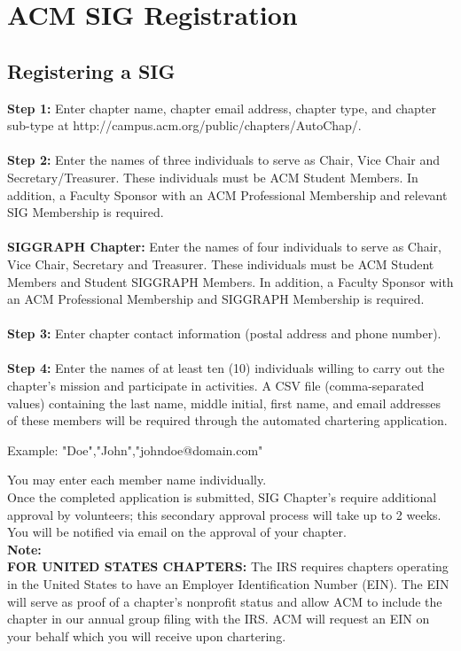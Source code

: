 %
%

\chapter{ACM SIG Registration}
\label{app:app02}

\section*{Registering a SIG}
\label{sec:sec01}

\textbf{Step 1:}  Enter chapter name, chapter email address, chapter type, and chapter sub-type at http://campus.acm.org/public/chapters/AutoChap/.
\\
\\
\textbf{Step 2:}  Enter the names of three individuals to serve as Chair, Vice Chair and Secretary/Treasurer. These individuals must be ACM Student Members. In addition, a Faculty Sponsor with an ACM Professional Membership and relevant SIG Membership is required.
\\
\\
\textbf{SIGGRAPH Chapter:}  Enter the names of four individuals to serve as Chair, Vice Chair, Secretary and Treasurer. These individuals must be ACM Student Members and Student SIGGRAPH Members. In addition, a Faculty Sponsor with an ACM Professional Membership and SIGGRAPH Membership is required.
\\
\\
\textbf{Step 3:}  Enter chapter contact information (postal address and phone number).
\\
\\
\textbf{Step 4:}  Enter the names of at least ten (10) individuals willing to carry out the chapter's mission and participate in activities.  A CSV file (comma-separated values) containing the last name, middle initial, first name, and email addresses of these members will be required through the automated chartering application.

\begin{flushright}
Example: "Doe","John","johndoe@domain.com"
\end{flushright}

You may enter each member name individually.
\\
Once the completed application is submitted, SIG Chapter's require additional approval by volunteers; this secondary approval process will take up to 2 weeks. You will be notified via email on the approval of your chapter.
\\
\textbf{Note:}
\\
\textbf{FOR UNITED STATES CHAPTERS:}  The IRS requires chapters operating in the United States to have an Employer Identification Number (EIN). The EIN will serve as proof of a chapter's nonprofit status and allow ACM to include the chapter in our annual group filing with the IRS. ACM will request an EIN on your behalf which you will receive upon chartering.
